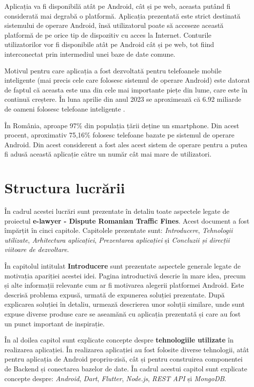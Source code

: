\documentclass[12pt,a4paper]{report}
\theoremstyle{definition}
\theoremstyle{remark}
\begin{document}
Aplicația va fi disponibilă atât pe Android, cât și pe web, aceasta putând fi considerată mai degrabă o platformă. Aplicația prezentată este strict destinată sistemului de operare Android, însă utilizatorul poate să acceseze această platformă de pe orice tip de dispozitiv cu acces la Internet. Conturile utilizatorilor vor fi disponibile atât pe Android cât și pe web, tot fiind interconectat prin intermediul unei baze de date comune.

Motivul pentru care aplicația a fost dezvoltată pentru telefoanele mobile inteligente (mai precis cele care folosesc sistemul de operare Android) este datorat de faptul că aceasta este una din cele mai importante piețe din lume, care este în continuă creștere. În luna aprilie din anul 2023 se aproximează că 6.92 miliarde de oameni folosesc telefoane inteligente \cite{Turner:2023}.

În România, aproape 97\% \cite{Ioana:2021} din populația țării deține un smartphone. Din acest procent, aproximativ 75,16\% \cite{statcounter:2023} folosesc telefoane bazate pe sistemul de operare Android. Din acest considerent a fost ales acest sistem de operare pentru a putea fi adusă această aplicație către un număr cât mai mare de utilizatori.
\newpage
\section{Structura lucrării}
\vspace{20pt}
În cadrul acestei lucrări sunt prezentate în detaliu toate aspectele legate de proiectul \textbf{e-lawyer - Dispute Romanian Traffic Fines}. Acest document a fost împărțit în cinci capitole. Capitolele prezentate sunt: \emph{Introducere}, \emph{Tehnologii utilizate}, \emph{Arhitectura aplicației}, \emph{Prezentarea aplicației} și \emph{Concluzii și direcții viitoare de dezvoltare}.

În capitolul intitulat \textbf{Introducere} sunt prezentate aspectele generale legate de motivația apariției acestei idei. Pagina introductivă descrie în mare idea, precum și alte informații relevante cum ar fi motivarea alegerii platformei Android. Este descrisă problema expusă, urmată de expunerea soluției prezentate. După explicarea soluției în detaliu, urmează descrierea unor soluții similare, unde sunt expuse diverse produse care se aseamănă cu aplicația prezentată și care au fost un punct important de inspirație. 

În al doilea capitol sunt explicate concepte despre \textbf{tehnologiile utilizate} în realizarea aplicației. În realizarea aplicației au fost folosite diverse tehnologii, atât pentru aplicația de Android propriu-zisă, cât și pentru construirea componentei de Backend și conectarea bazelor de date. În cadrul acestui capitol sunt explicate concepte despre: \emph{Android}, \emph{Dart}, \emph{Flutter}, \emph{Node.js}, \emph{REST API} și \emph{MongoDB}.
\end{document}
